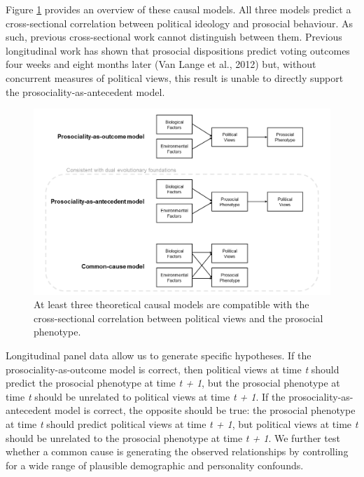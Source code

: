 \documentclass[
  man,floatsintext]{apa6}
\begin{document}
Figure \ref{fig:theoreticalModels} provides an overview of these causal
models. All three models predict a cross-sectional correlation between political
ideology and prosocial behaviour. As such, previous cross-sectional work
cannot distinguish between them. Previous longitudinal work has shown that
prosocial dispositions predict voting outcomes four weeks and eight months
later (Van Lange et al., 2012) but, without concurrent measures of political views, this
result is unable to directly support the prosociality-as-antecedent model.





\begin{figure}
\includegraphics[width=\textwidth]{images/theoreticalModels} \caption{At least three theoretical causal models are
compatible with the cross-sectional correlation between political views and
the prosocial phenotype.}\label{fig:theoreticalModels}
\end{figure}

Longitudinal panel data allow us to generate specific hypotheses. If the
prosociality-as-outcome model is correct, then political views at time \emph{t}
should predict the prosocial phenotype at time \emph{t + 1}, but the prosocial
phenotype at time \emph{t} should be unrelated to political views at time \emph{t + 1}.
If the prosociality-as-antecedent model is correct, the opposite should be true:
the prosocial phenotype at time \emph{t} should predict political views at time
\emph{t + 1}, but political views at time \emph{t} should be unrelated to the prosocial
phenotype at time \emph{t + 1}. We further test whether a common cause is generating
the observed relationships by controlling for a wide range of plausible
demographic and personality confounds.
\end{document}
